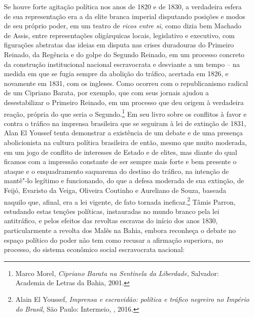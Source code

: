 Se houve forte agitação política nos anos de 1820 e de 1830, a
verdadeira esfera de sua representação era a da elite branca imperial
disputando posições e modos de seu próprio poder, em um teatro de
\emph{ricos entre si}, como dizia bem Machado de Assis, entre
representações oligárquicas locais, legislativo e executivo, com
figurações abstratas das ideias em disputa nas crises duradouras do
Primeiro Reinado, da Regência e do golpe do Segundo Reinado, em um
processo concreto da construção institucional nacional escravocrata e
desviante a um tempo -- na medida em que se fugia sempre da abolição do
tráfico, acertada em 1826, e novamente em 1831, com os ingleses. Como
ocorreu com o republicanismo radical de um Cipriano Barata, por exemplo,
que com seus jornais ajudou a desestabilizar o Primeiro Reinado, em um
processo que deu origem à verdadeira reação, própria do que seria o
Segundo.\footnote{Marco Morel, \emph{Cipriano Barata na Sentinela da
  Liberdade}, Salvador: Academia de Letras da Bahia, 2001.} Em seu livro
sobre os conflitos à favor e contra o tráfico na imprensa brasileira que
se seguiram à lei de extinção de 1831, Alan El Youssef tenta demonstrar
a existência de um debate e de uma presença abolicionista na cultura
política brasileira de então, mesmo que muito moderada, em um jogo de
conflito de interesses de Estado e de elites, mas diante do qual ficamos
com a impressão constante de ser sempre mais forte e bem presente o
ataque e o enquadramento saquarema do destino do tráfico, na intenção de
mantê"-lo legítimo e funcionando, do que a defesa moderada de sua
extinção, de Feijó, Evaristo da Veiga, Oliveira Coutinho e Aureliano de
Souza, baseada naquilo que, afinal, era a lei vigente, de fato tornada
ineficaz.\footnote{Alain El Youssef, \emph{Imprensa e escravidão:
  política e tráfico negreiro no Império do Brasil}, São Paulo:
  Intermeio, , 2016.} Tâmis Parron, estudando estas tenções
políticas, instauradas no mundo branco pela lei antitráfico, e pelos
efeitos das revoltas escravas do início dos anos 1830, particularmente a
revolta dos Malês na Bahia, embora reconheça o debate no espaço político
do poder não tem como recusar a afirmação superiora, no processo, do
sistema econômico social escravocrata nacional:

